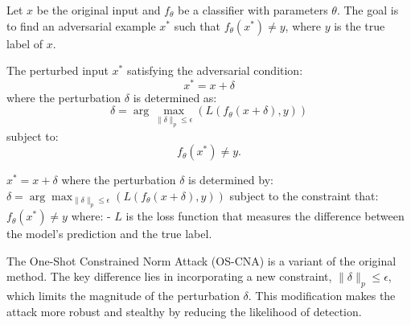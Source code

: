 Let \( x \) be the original input and \( f_\theta \) be a classifier with parameters \( \theta \). The goal is to find an adversarial example \( x^* \) such that \( f_\theta(x^*) \neq y \), where \( y \) is the true label of \( x \).

The perturbed input \( x^* \) satisfying the adversarial condition:
\[
x^* = x + \delta
\]
where the perturbation \( \delta \) is determined as:
\[
\delta = \arg\max_{\|\delta\|_p \leq \epsilon} \left( L(f_\theta(x + \delta), y) \right)
\]
subject to:
\[
f_\theta(x^*) \neq y.
\]

$x^* = x + \delta$
where the perturbation $\delta$ is determined by:
$\delta = \arg\max_{\|\delta\|_p \leq \epsilon} \left( L(f_\theta(x + \delta), y) \right)$
subject to the constraint that:
$f_\theta(x^*) \neq y$
where:
- $L$ is the loss function that measures the difference between the model's prediction and the true label.

The One-Shot Constrained Norm Attack (OS-CNA) is a variant of the original method. The key difference lies in incorporating a new constraint, $\|\delta\|_p \leq \epsilon$, which limits the magnitude of the perturbation $\delta$. This modification makes the attack more robust and stealthy by reducing the likelihood of detection.